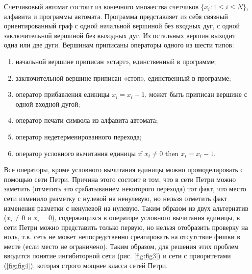 Счетчиковый автомат состоит из конечного множества счетчиков $ \{ x_{i} : 1 \leq i \leq N \} $, алфавита и программы автомата. Программа представляет из себя связный ориентированный граф с одной начальной вершиной без входных дуг, с одной заключительной вершиной без выходных дуг. Из остальных вершин выходит одна или две дуги. Вершинам приписаны операторы одного из шести типов:
\begin{enumerate}
\item начальной вершине приписан «старт», единственный в программе;
\item заключительной вершине приписан «стоп», единственный в программе;
\item оператор прибавления единицы $ x_{i} = x_{i} + 1 $, может быть приписан вершине с одной входной дугой;
\item оператор печати символа из алфавита автомата;
\item оператор недетерменированного перехода;
\item оператор условного вычитания единицы if $ x_{i} \neq 0 $ then $ x_{i} = x_{i} - 1 $.
\end{enumerate}

Все операторы, кроме условного вычитания единицы можно промоделировать с помощью сети Петри. Причина этого состоит в том, что в сети Петри можно заметить (отметить это срабатыванием некоторого перехода) тот факт, что место сети изменило разметку с нулевой на ненулевую, но нельзя отметить факт изменения разметки с ненулевой на нулевую. Таким образом из двух альтернатив ($ x_{i} \neq 0 $ и $ x_{i} = 0 $), содержащихся в операторе условного вычитания единицы, в сети Петри можно представить только первую, но нельзя отобразить проверку на ноль, т.к. сеть не может непосредственно среагировать на отсутствие фишки в месте (если место не ограничено).\cite{Piterson} Таким образом, для решения этих проблем вводится понятие ингибиторной сети (рис. \ref{fig:fig3}) и сети с приоритетами (\ref{fig:fig4}), которая строго мощнее класса сетей Петри. 

